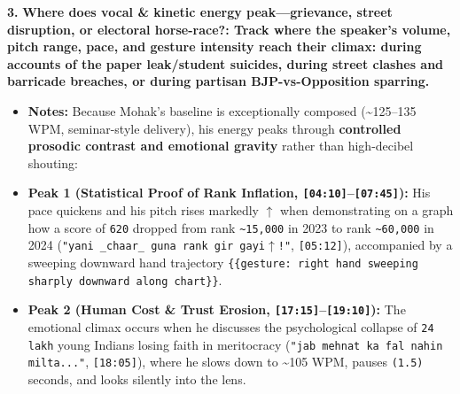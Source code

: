 \documentclass[10pt,a4paper]{article}
\begin{document}
\noindent\textbf{3.} \textbf{Where does vocal \& kinetic energy peak---grievance, street disruption, or electoral horse-race?: Track where the speaker's volume, pitch range, pace, and gesture intensity reach their climax: during accounts of the paper leak/student suicides, during street clashes and barricade breaches, or during partisan BJP-vs-Opposition sparring.}\par\smallskip
\begin{itemize}
  \item \textbf{Notes:}
Because Mohak's baseline is exceptionally composed (\textasciitilde{}125--135 WPM, seminar-style delivery), his energy peaks through \textbf{controlled prosodic contrast and emotional gravity} rather than high-decibel shouting:\par\smallskip
  \item \textbf{Peak 1 (Statistical Proof of Rank Inflation, \texttt{[04:10]}--\texttt{[07:45]}):} His pace quickens and his pitch rises markedly \texttt{$\uparrow$} when demonstrating on a graph how a score of \texttt{620} dropped from rank \texttt{\textasciitilde{}15,000} in 2023 to rank \texttt{\textasciitilde{}60,000} in 2024 (\texttt{"yani \_chaar\_ guna rank gir gayi$\uparrow$!"}, \texttt{[05:12]}), accompanied by a sweeping downward hand trajectory \texttt{\{\{gesture: right hand sweeping sharply downward along chart\}\}}.
  \item \textbf{Peak 2 (Human Cost \& Trust Erosion, \texttt{[17:15]}--\texttt{[19:10]}):} The emotional climax occurs when he discusses the psychological collapse of \texttt{24 lakh} young Indians losing faith in meritocracy (\texttt{"jab mehnat ka fal nahin milta..."}, \texttt{[18:05]}), where he slows down to \textasciitilde{}105 WPM, pauses \texttt{(1.5)} seconds, and looks silently into the lens.
\end{itemize}
\end{document}
